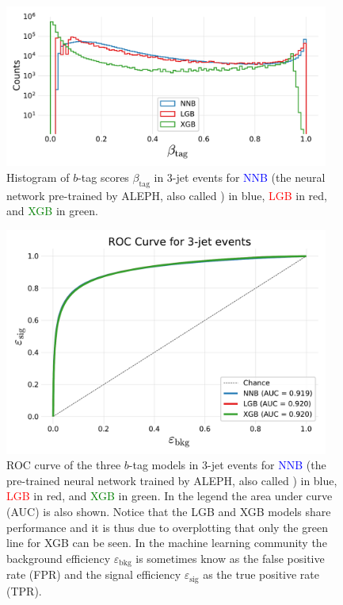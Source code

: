 \begin{figure}
  \includegraphics[width=0.95\textwidth, trim=0 0 0 30, clip]{figures/quarks/y_pred_3_jet_hist-down_sample=1.00-ML_vars=vertex-selection=b-ejet_min=4-n_iter_RS_lgb=99-n_iter_RS_xgb=9-cdot_cut=0.90-version=19.pdf}
  \caption[b-tag scores in 3-jet events]
          {Histogram of $b$-tag scores $\beta_\mathrm{tag}$ in 3-jet events for \textcolor{blue}{NNB} (the neural network pre-trained by ALEPH, also called ) in blue, \textcolor{red}{LGB} in red, and \textcolor{green}{XGB} in green. 
          } 
  \label{fig:q:btag_scores_3j}
\end{figure}


\begin{figure}
  \includegraphics[width=0.95\textwidth, trim=10 10 10 40, clip]{figures/quarks/ROC_3_jet-down_sample=1.00-ML_vars=vertex-selection=b-ejet_min=4-n_iter_RS_lgb=99-n_iter_RS_xgb=9-cdot_cut=0.90-version=19.pdf}
  \caption[ROC curve for 3-jet $b$-tagging]
          {ROC curve of the three $b$-tag models in 3-jet events for \textcolor{blue}{NNB} (the pre-trained neural network trained by ALEPH, also called ) in blue, \textcolor{red}{LGB} in red, and \textcolor{green}{XGB} in green. In the legend the area under curve (AUC) is also shown. Notice that the LGB and XGB models share performance and it is thus due to overplotting that only the green line for XGB can be seen. In the machine learning community the background efficiency $\varepsilon_\mathrm{bkg}$ is sometimes know as the false positive rate (FPR) and the signal efficiency $\varepsilon_\mathrm{sig}$ as the true positive rate (TPR).  
          } 
  \label{fig:q:roc_btag_3j}
\end{figure}



